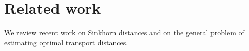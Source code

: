 

\section{Related work}\label{sec:related}

We review recent work on Sinkhorn distances and on the general problem of estimating optimal transport distances. 

